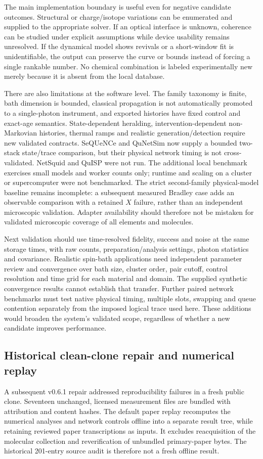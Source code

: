 \documentclass[11pt,a4paper]{article}
\begin{document}
The main implementation boundary is useful even for negative candidate outcomes. Structural or charge/isotope variations can be enumerated and supplied to the appropriate solver. If an optical interface is unknown, coherence can be studied under explicit assumptions while device usability remains unresolved. If the dynamical model shows revivals or a short-window fit is unidentifiable, the output can preserve the curve or bounds instead of forcing a single rankable number. No chemical combination is labeled experimentally new merely because it is absent from the local database.

There are also limitations at the software level. The family taxonomy is finite, bath dimension is bounded, classical propagation is not automatically promoted to a single-photon instrument, and exported histories have fixed control and exact-age semantics. State-dependent heralding, intervention-dependent non-Markovian histories, thermal ramps and realistic generation/detection require new validated contracts. SeQUeNCe and QuNetSim now supply a bounded two-stack state/trace comparison, but their physical network timing is not cross-validated. NetSquid and QuISP were not run. The additional local benchmark exercises small models and worker counts only; runtime and scaling on a cluster or supercomputer were not benchmarked. The strict second-family physical-model baseline remains incomplete: a subsequent measured Bradley case adds an observable comparison with a retained $X$ failure, rather than an independent microscopic validation. Adapter availability should therefore not be mistaken for validated microscopic coverage of all elements and molecules.

Next validation should use time-resolved fidelity, success and noise at the same storage times, with raw counts, preparation/analysis settings, photon statistics and covariance. Realistic spin-bath applications need independent parameter review and convergence over bath size, cluster order, pair cutoff, control resolution and time grid for each material and domain. The supplied synthetic convergence results cannot establish that transfer. Further paired network benchmarks must test native physical timing, multiple slots, swapping and queue contention separately from the imposed logical trace used here. These additions would broaden the system's validated scope, regardless of whether a new candidate improves performance.

\subsection{Historical clean-clone repair and numerical replay}
A subsequent v0.6.1 repair addressed reproducibility failures in a fresh public clone. Seventeen unchanged, licensed measurement files are bundled with attribution and content hashes. The default paper replay recomputes the numerical analyses and network controls offline into a separate result tree, while retaining reviewed paper transcriptions as inputs. It excludes reacquisition of the molecular collection and reverification of unbundled primary-paper bytes. The historical 201-entry source audit is therefore not a fresh offline result.
\end{document}
